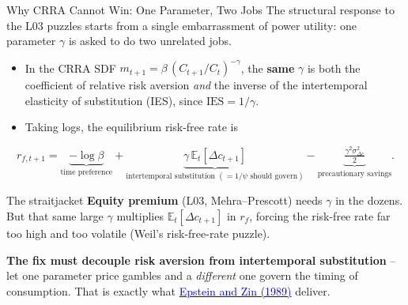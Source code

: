 \documentclass{beamer}
\newcommand{\E}{\mathbb{E}}
\begin{document}
\begin{frame}{Why CRRA Cannot Win: One Parameter, Two Jobs}
The structural response to the L03 puzzles starts from a single embarrassment of power utility: \alert{one parameter $\gamma$ is asked to do two unrelated jobs}.
\begin{itemize}
  \item In the CRRA SDF $m_{t+1}=\beta\,(C_{t+1}/C_t)^{-\gamma}$, the \textbf{same} $\gamma$ is both the coefficient of relative risk aversion \textit{and} the inverse of the intertemporal elasticity of substitution (IES), since $\mathrm{IES}=1/\gamma$.
  \item Taking logs, the equilibrium risk-free rate is
\end{itemize}
\begin{equation*}
  r_{f,t+1}=\underbrace{-\log\beta}_{\text{time preference}}
            +\underbrace{\gamma\,\E_t[\Delta c_{t+1}]}_{\text{intertemporal substitution }(=1/\psi\text{ should govern})}
            -\underbrace{\tfrac{\gamma^2\sigma^2_{\Delta c}}{2}}_{\text{precautionary savings}} .
\end{equation*}
\begin{block}{The straitjacket}
\textbf{Equity premium} (L03, Mehra--Prescott) needs $\gamma$ in the \alert{dozens}. But that same large $\gamma$ multiplies $\E_t[\Delta c_{t+1}]$ in $r_f$, forcing the \alert{risk-free rate far too high and too volatile} (Weil's risk-free-rate puzzle).
\end{block}
\textbf{The fix must decouple risk aversion from intertemporal substitution} -- let one parameter price gambles and a \textit{different} one govern the timing of consumption. That is exactly what \href{https://doi.org/10.2307/1913778}{\textcolor{blue}{Epstein and Zin (1989)}} deliver.
\end{frame}
\end{document}
